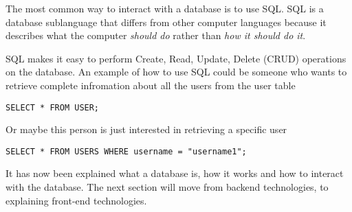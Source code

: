 \documentclass[../../master.tex]{subfiles}
\begin{document}
The most common way to interact with a database is to use SQL.
SQL is a database sublanguage that differs from other computer languages because it describes what the computer \textit{should do} rather than \textit{how it should do it}.\cite{SQLIntroduction}

SQL makes it easy to perform Create, Read, Update, Delete (CRUD) operations on the database.\cite{OracleWhatIsDatabase}
An example of how to use SQL could be someone who wants to retrieve complete infromation about all the users from the user table

\begin{lstlisting}[caption={An SQL query that fetches complete information for every user}, label=lstSQL-user1]
SELECT * FROM USER;
\end{lstlisting}

Or maybe this person is just interested in retrieving a specific user

\begin{lstlisting}[caption={An SQL query that only fetches complete information for username1}, label=lstSQL-user2]
SELECT * FROM USERS WHERE username = "username1";
\end{lstlisting}

It has now been explained what a database is, how it works and how to interact with the database.
The next section will move from backend technologies, to explaining front-end technologies.
\end{document}
